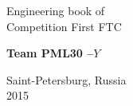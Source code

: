 \begin{titlepage}
\begin{center}
		\LARGE{Engineering book of \\ Competition First FTC}
		
		\vspace{2em}
		
		\bf\fontsize{50}{60}\selectfont Team PML30 --${Y}$ \\  \fontsize{11}{13}\selectfont
		
		\vspace{6em}
		
		\begin{figure}[H]
		\end{figure}
		
		\LARGE\normalfont Saint-Petersburg, Russia	\\ 2015
	\end{center}
\end{titlepage}

\newpage

